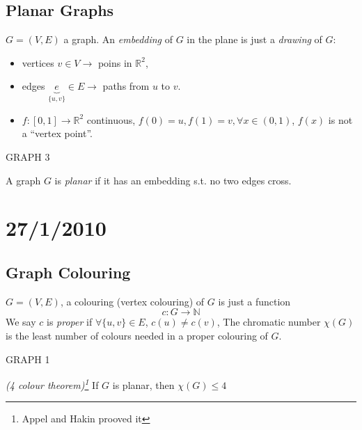 \documentclass{article}
\begin{document}
\subsection*{Planar Graphs}
$G=(V,E)$ a graph.  An \emph{embedding} of $G$ in the plane is just a \emph{drawing} of $G$:
\begin{itemize}
 \item vertices $v \in V \rightarrow$ poins in $\mathbb{R}^2$,
\item edges $\underbrace{e}_{\{u,v\}} \in E \rightarrow$ paths from $u$ to $v$.
\item  $f:[0,1]\rightarrow \mathbb{R}^2$ continuous, $f(0)=u, f(1)=v, \forall x \in (0,1)$, $f(x)$ is not a ``vertex point''.
\end{itemize}

GRAPH 3

\begin{defn}
A graph $G$ is \emph{planar} if it has an embedding s.t. no two edges cross.
\end{defn}

\section*{27/1/2010}

\subsection*{Graph Colouring}

\begin{rec}
$G=(V,E)$, a colouring (vertex colouring) of $G$ is just a function \[c:G\rightarrow \mathbb{N}\]  We say $c$ is \emph{proper} if $\forall \{u,v\} \in E$, $c(u) \neq c(v)$,  The chromatic number $\chi(G)$ is the least number of colours needed in a proper colouring of $G$.
\end{rec}

\begin{examp}
GRAPH 1
\end{examp}

\begin{thm}
\emph{(4 colour theorem)\footnote{Appel and Hakin prooved it}} If $G$ is planar, then $\chi(G)\leq 4$
\end{thm}
\end{document}
